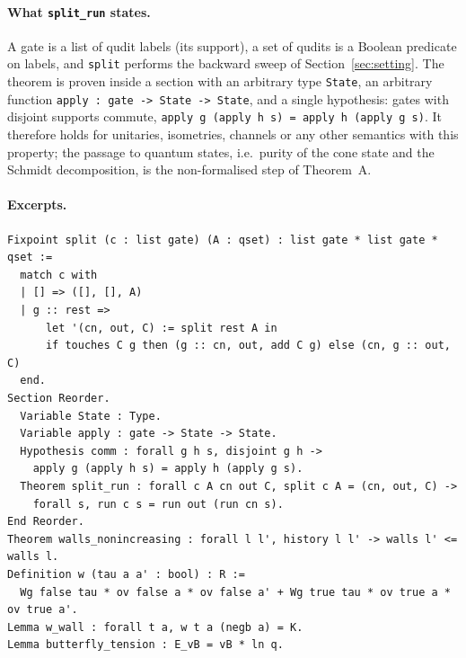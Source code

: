 \paragraph{What \texttt{split\_run} states.} A gate is a list of qudit labels (its support), a set of qudits is a Boolean predicate on labels, and \texttt{split} performs the backward sweep of Section~\ref{sec:setting}. The theorem is proven inside a section with an arbitrary type \texttt{State}, an arbitrary function \texttt{apply : gate -> State -> State}, and a single hypothesis: gates with disjoint supports commute, \texttt{apply g (apply h s) = apply h (apply g s)}. It therefore holds for unitaries, isometries, channels or any other semantics with this property; the passage to quantum states, i.e.\ purity of the cone state and the Schmidt decomposition, is the non-formalised step of Theorem~A.

\paragraph{Excerpts.}
\begin{lstlisting}
Fixpoint split (c : list gate) (A : qset) : list gate * list gate * qset :=
  match c with
  | [] => ([], [], A)
  | g :: rest =>
      let '(cn, out, C) := split rest A in
      if touches C g then (g :: cn, out, add C g) else (cn, g :: out, C)
  end.
Section Reorder.
  Variable State : Type.
  Variable apply : gate -> State -> State.
  Hypothesis comm : forall g h s, disjoint g h ->
    apply g (apply h s) = apply h (apply g s).
  Theorem split_run : forall c A cn out C, split c A = (cn, out, C) ->
    forall s, run c s = run out (run cn s).
End Reorder.
Theorem walls_nonincreasing : forall l l', history l l' -> walls l' <= walls l.
Definition w (tau a a' : bool) : R :=
  Wg false tau * ov false a * ov false a' + Wg true tau * ov true a * ov true a'.
Lemma w_wall : forall t a, w t a (negb a) = K.
Lemma butterfly_tension : E_vB = vB * ln q.
\end{lstlisting}
